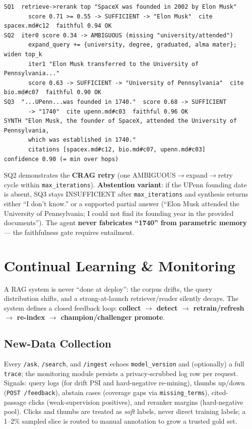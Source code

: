 \documentclass[12pt,a4paper]{article}
\begin{document}
\begin{lstlisting}[basicstyle=\ttfamily\footnotesize]
SQ1  retrieve->rerank top "SpaceX was founded in 2002 by Elon Musk"
       score 0.71 >= 0.55 -> SUFFICIENT -> "Elon Musk"  cite spacex.md#c12  faithful 0.94 OK
SQ2  iter0 score 0.34 -> AMBIGUOUS (missing "university/attended")
       expand_query += {university, degree, graduated, alma mater}; widen top_k
       iter1 "Elon Musk transferred to the University of Pennsylvania..."
       score 0.63 -> SUFFICIENT -> "University of Pennsylvania"  cite bio.md#c07  faithful 0.90 OK
SQ3  "...UPenn...was founded in 1740."  score 0.68 -> SUFFICIENT
       -> "1740"  cite upenn.md#c03  faithful 0.96 OK
SYNTH "Elon Musk, the founder of SpaceX, attended the University of Pennsylvania,
       which was established in 1740."
       citations [spacex.md#c12, bio.md#c07, upenn.md#c03]   confidence 0.90 (= min over hops)
\end{lstlisting}

\noindent SQ2 demonstrates the \textbf{CRAG retry} (one AMBIGUOUS$\rightarrow$expand$\rightarrow$retry cycle within \texttt{max\_iterations}). \textbf{Abstention variant}: if the UPenn founding date is absent, SQ3 stays INSUFFICIENT after \texttt{max\_iterations} and synthesis returns either ``I don't know.'' or a supported partial answer (``Elon Musk attended the University of Pennsylvania; I could not find its founding year in the provided documents''). The agent \textbf{never fabricates ``1740'' from parametric memory} --- the faithfulness gate requires entailment.

\section{Continual Learning \& Monitoring}

A RAG system is never ``done at deploy'': the corpus drifts, the query distribution shifts, and a strong-at-launch retriever/reader silently decays. The system defines a closed feedback loop: \textbf{collect $\rightarrow$ detect $\rightarrow$ retrain/refresh $\rightarrow$ re-index $\rightarrow$ champion/challenger promote}.

\subsection{New-Data Collection}

Every \texttt{/ask}, \texttt{/search}, and \texttt{/ingest} echoes \texttt{model\_version} and (optionally) a full \texttt{trace}; the monitoring module persists a privacy-scrubbed log row per request. Signals: query logs (for drift PSI and hard-negative re-mining), thumbs up/down (\texttt{POST /feedback}), abstain cases (coverage gaps via \texttt{missing\_terms}), cited-passage clicks (weak-supervision positives), and reranker margins (hard-negative pool). Clicks and thumbs are treated as \emph{soft} labels, never direct training labels; a 1--2\% sampled slice is routed to manual annotation to grow a trusted gold set.
\end{document}
